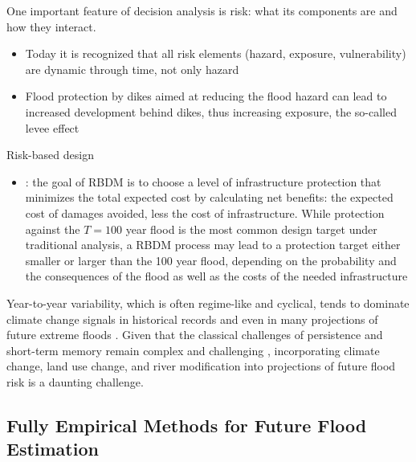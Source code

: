 \documentclass[11pt]{article}
\begin{document}
One important feature of decision analysis is risk: what its components are and how they interact.
\begin{itemize}
  \item Today it is recognized that all risk elements (hazard, exposure, vulnerability) are dynamic through time, not only hazard \citep{IPCC2012,Jongman2012,Merz2014}
  \item Flood protection by dikes aimed at reducing the flood hazard can lead to increased development behind dikes, thus increasing exposure, the so-called levee effect \citep{Tobin1995}
\end{itemize}

Risk-based design
\begin{itemize}
  \item \citet{Rosner2014}: the goal of RBDM is to choose a level of infrastructure protection that minimizes the total expected cost by calculating net benefits: the expected cost of damages avoided, less the cost of infrastructure. While protection against the $T=100$ year flood is the most common design target under traditional analysis, a RBDM process may lead to a protection target either smaller or larger than the 100 year flood, depending on the probability and the consequences of the flood as well as the costs of the needed infrastructure
\end{itemize}

Year-to-year variability, which is often regime-like and cyclical, tends to dominate climate change signals in historical records \citep{Merz2014,Hodgkins2017} and even in many projections of future extreme floods \citep{Dittes2017}.
Given that the classical challenges of persistence and short-term memory remain complex and challenging \citep{Matalas2012}, incorporating climate change, land use change, and river modification into projections of future flood risk is a daunting challenge.


\subsection{Fully Empirical Methods for Future Flood Estimation}
\end{document}
